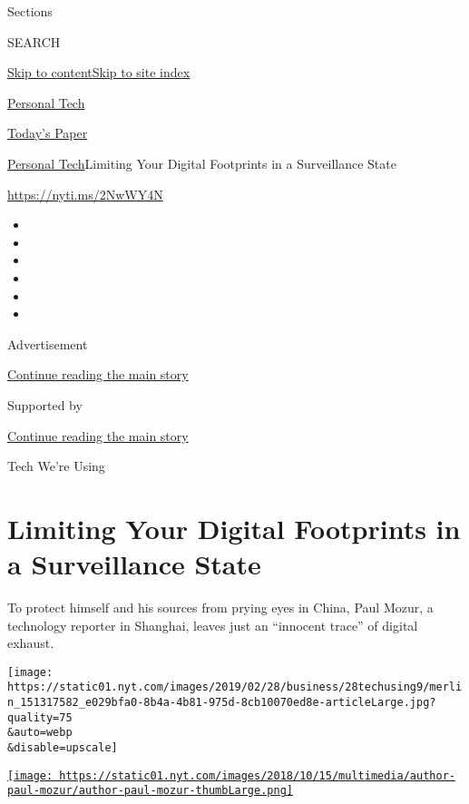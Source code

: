 Sections

SEARCH

\protect\hyperlink{site-content}{Skip to
content}\protect\hyperlink{site-index}{Skip to site index}

\href{https://www.nytimes.com/section/technology/personaltech}{Personal
Tech}

\href{https://myaccount.nytimes.com/auth/login?response_type=cookie\&client_id=vi}{}

\href{https://www.nytimes.com/section/todayspaper}{Today's Paper}

\href{/section/technology/personaltech}{Personal Tech}\textbar{}Limiting
Your Digital Footprints in a Surveillance State

\url{https://nyti.ms/2NwWY4N}

\begin{itemize}
\item
\item
\item
\item
\item
\item
\end{itemize}

Advertisement

\protect\hyperlink{after-top}{Continue reading the main story}

Supported by

\protect\hyperlink{after-sponsor}{Continue reading the main story}

Tech We're Using

\hypertarget{limiting-your-digital-footprints-in-a-surveillance-state}{%
\section{Limiting Your Digital Footprints in a Surveillance
State}\label{limiting-your-digital-footprints-in-a-surveillance-state}}

To protect himself and his sources from prying eyes in China, Paul
Mozur, a technology reporter in Shanghai, leaves just an ``innocent
trace'' of digital exhaust.

\texttt{[image: https://static01.nyt.com/images/2019/02/28/business/28techusing9/merlin\_151317582\_e029bfa0-8b4a-4b81-975d-8cb10070ed8e-articleLarge.jpg?quality=75\\\&auto=webp\\\&disable=upscale]}

\href{https://www.nytimes.com/by/paul-mozur}{\texttt{[image: https://static01.nyt.com/images/2018/10/15/multimedia/author-paul-mozur/author-paul-mozur-thumbLarge.png]}}

